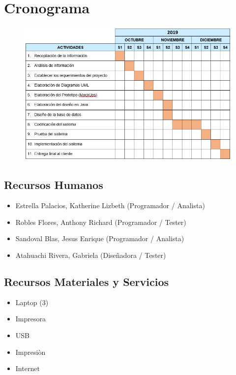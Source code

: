 \documentclass[preprint,12pt]{elsarticle}
\begin{document}
\section{Cronograma}
\begin{figure}[htb]
	\begin{center}
		\includegraphics[width=12cm]{./IMAGENES/cronograma} 
	\end{center}
\end{figure}

\subsection{\textbf{Recursos Humanos}}
\begin{itemize}
	\item Estrella Palacios, Katherine Lizbeth (Programador / Analista)
	\item Robles Flores, Anthony Richard (Programador / Tester)
	\item Sandoval Blas, Jesus Enrique (Programador / Analista)
	\item Atahuachi Rivera, Gabriela  (Diseñadora / Tester)
\end{itemize}

\subsection{\textbf{Recursos Materiales y Servicios}}
\begin{itemize}
	\item Laptop (3)
	\item Impresora
	\item USB
	\item Impresiòn
	\item Internet
\end{itemize}
\end{document}
